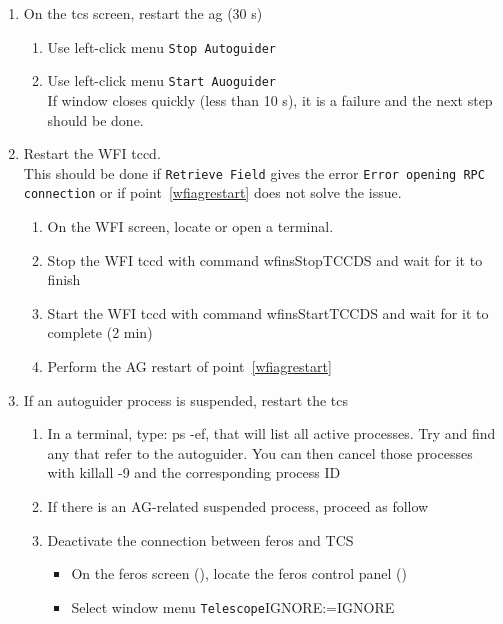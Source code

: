 \documentclass[11pt,fleqn,a4paper]{book}
\makeatletter
\def\menu#1#2{\texttt{#1}\ifx{}#2\else\@for\@x:=#2\do{$\rightarrow$\texttt{\@x}}\fi}
\def\wmenu#1#2{window menu \menu{#1}{#2}}
\makeatother
\begin{document}
\begin{enumerate}
  \item\label{wfiagrestart}
       On the \acrlong{tcs} screen, restart the \acrlong{ag} (30 s)
    \begin{enumerate}
       \item Use left-click menu \texttt{Stop Autoguider}
       \item Use left-click menu \texttt{Start Auoguider}\\
             If window closes quickly (less than 10 s), it is a failure and
             the next step should be done.  \\
    \end{enumerate}
  \item Restart the WFI \acrlong{tccd}.\\
        This should be done if \texttt{Retrieve Field} gives the error \texttt{Error opening RPC connection} or if point~\ref{wfiagrestart} does not solve the issue.
    \begin{enumerate}
       \item On the WFI screen, locate or open a terminal.
       \item Stop the WFI \acrlong{tccd} with command
             \gls{wfinsStopTCCDS} and wait for it to finish
       \item Start the WFI \acrlong{tccd} with command \gls{wfinsStartTCCDS} and wait for it to complete (2 min)
       \item Perform the AG restart of point~\ref{wfiagrestart}
    \end{enumerate}
  \item If an autoguider process is suspended, restart the \gls{tcs}
    \begin{enumerate}
       \item In a terminal, type: ps -ef, that will list all active processes. Try and find any that refer to the autoguider. You can then cancel those processes with killall -9 and the corresponding process ID
       \item If there is an AG-related suspended process, proceed as follow
       \item Deactivate the connection between \gls{feros} and TCS
           \begin{itemize}
                \item On the \gls{feros} screen (), locate the \gls{feros} control panel ()
                \item Select \wmenu{Telescope}{IGNORE}
           \end{itemize}

\end{enumerate}
\end{enumerate}
\end{document}
